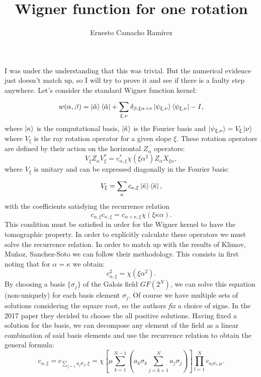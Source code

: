 \documentclass[a4paper]{article}
\title{Wigner function for one rotation}
\author{Ernesto Camacho Ramírez}
\begin{document}
  \maketitle

  I was under the understanding that this was trivial. But
  the numerical evidence just doesn't match up, so I will
  try to prove it and see if there is a faulty step
  anywhere.  Let's consider the standard Wigner function
  kernel:
  \begin{equation}
    \label{eqn:ray_kernel}
    w(\alpha,\beta)
    = \ket{\tilde\alpha}\bra{\tilde\alpha}
    + \sum_{\xi,\nu}^{} \delta_{\beta,\xi\alpha+\nu} 
    \ket{\psi_{\xi,\nu}}\bra{\psi_{\xi,\nu}}
    - I,
  \end{equation}
  where $\ket{\kappa}$ is the computational basis,
  $\ket{\tilde\kappa}$ is the Fourier basis and
  $\ket{\psi_{\xi,\nu}} = V_\xi \ket{\nu}$ where $V_\xi$ is
  the ray rotation operator for a given slope $\xi$. These
  rotation operators are defined by their action on the
  horizontal $Z_\alpha$ operators:
  \begin{equation}
    V_\xi Z_\alpha V_\xi^{*}
    = c_{\alpha,\xi}^* \chi(\xi \alpha^2) Z_\alpha
    X_{\xi\alpha},
  \end{equation}
  where $V_\xi$ is unitary and can be expressed diagonally
  in the Fourier basis:
  \begin{equation}
    V_\xi
    = \sum_{\kappa}^{} c_{\kappa,\xi} \ket{\tilde\kappa}
    \bra{\tilde\kappa},
  \end{equation}
  with the coefficients satisfying the recurrence relation
  \begin{equation}
    c_{\alpha,\xi} c_{\kappa,\xi}
    = c_{\alpha+\kappa,\xi} \chi(\xi\kappa\alpha).
  \end{equation}
  This condition must be satisfied in order for the Wigner
  kernel to have the tomographic property. In order to
  explícitly calculate these operators we must solve the
  recurrence relation. In order to match up with the results
  of Klimov, Muñoz, Sanchez-Soto we can follow their
  methodology. This consists in first noting that for
  $\alpha = \kappa$ we obtain:
  \begin{equation}
    c_{\alpha,\xi}^2 = \chi(\xi\alpha^2).
  \end{equation}
  By choosing a basis $\{\sigma_j\}$ of the Galois field
  $GF(2^N)$, we can solve this equation (non-uniquely) for
  each basis element $\sigma_j$. Of course we have multiple
  sets of solutions considering the square root, so the
  authors \textit{fix} a choice of signs. In the 2017 paper
  they decided to choose the all positive solutions. Having
  fixed a solution for the basis, we can decompose any
  element of the field as a linear combination of said basis
  elements and use the recurrence relation to obtain the
  general formula:
  \begin{equation}
    c_{\alpha,\xi}
    = c_{\sum_{j=1}^{} a_j \sigma_j,\xi}
    = \chi\left[
    \mu \sum_{k=1}^{N-1} \left(
      a_k \sigma_k 
      \sum_{j=k+1}^{N} a_j \sigma_j
    \right) \right]
    \prod_{l=1}^N c_{a_l \sigma_l, \mu}.
  \end{equation}
\end{document}
